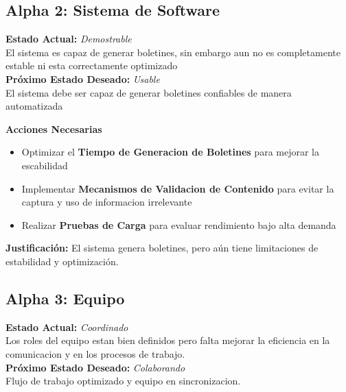 \documentclass[12pt]{article}
\begin{document}
\vspace{0.3cm}

\subsection{Alpha 2: Sistema de Software}


\textbf{Estado Actual:} \textit{Demostrable} \\
\hspace*{1cm} El sistema es capaz de generar boletines, sin embargo aun
no es completamente estable ni esta correctamente optimizado \\
\textbf{Próximo Estado Deseado:} \textit{Usable} \\
\hspace*{1cm} El sistema debe ser capaz de generar boletines confiables 
de manera automatizada

    
\vspace{0.1cm}

\textbf{Acciones Necesarias}
\begin{itemize}
    \item Optimizar el \textbf{Tiempo de Generacion de 
    Boletines}  para mejorar la escabilidad 
    \item Implementar \textbf{Mecanismos de Validacion de Contenido}
    para evitar la captura y uso de informacion irrelevante
    \item Realizar \textbf{Pruebas de Carga} para evaluar 
    rendimiento bajo alta demanda
\end{itemize}

\vspace{0.1cm}

\textbf{Justificación:} El sistema genera boletines, 
pero aún tiene limitaciones de estabilidad y optimización.

\vspace{0.3cm}

\subsection{Alpha 3: Equipo}


\textbf{Estado Actual:} \textit{Coordinado} \\
\hspace*{1cm} Los roles del equipo estan bien definidos 
pero falta mejorar la eficiencia en la 
comunicacion y en los procesos de trabajo. \\
\textbf{Próximo Estado Deseado:} \textit{Colaborando} \\
\hspace*{1cm} Flujo de trabajo optimizado y equipo en 
sincronizacion.
 
\end{document}
